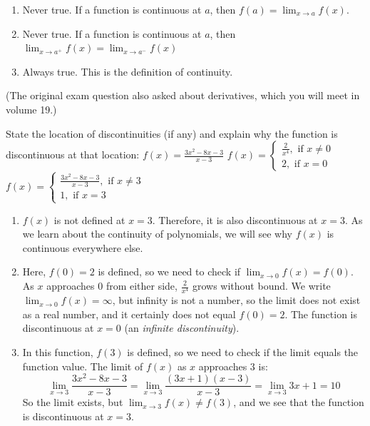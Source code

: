\begin{Answer}[ref = continuity1]
\begin{enumerate}
\item Never true. If a function is continuous at $a$, then $f(a) = \lim_{x \to 
a} f(x)$. 
\item Never true. If a function is continuous at $a$, then $\lim_{x \to a^+} 
f(x) = \lim_{x \to a^-} f(x)$
\item Always true. This is the definition of continuity.
\end{enumerate}
(The original exam question also asked about derivatives, which you will
meet in volume 19.)
\end{Answer}

\begin{Exercise}[title=Limits Practice 5, label=limits5]
State the location of discontinuities (if any) and explain why the function is 
discontinuous at that location:
    \Question $f(x) = \frac{3x^2-8x-3}{x-3}$
    \Question $f(x) = \begin{cases}
    \frac{2}{x^4}, \text{ if } x \neq 0\\
    2, \text{ if } x=0
    \end{cases}$
    \Question $f(x) = \begin{cases}
        \frac{3x^2-8x-3}{x-3}, \text{ if } x \neq 3\\
        1, \text{ if } x=3
    \end{cases}$
\end{Exercise}

\begin{Answer}[ref=limits5]
    \begin{enumerate}
    \item $f(x)$ is not defined at $x = 3$. Therefore, it is also discontinuous
     at $x = 3$. As we learn about the continuity of polynomials, we will see 
     why $f(x)$ is continuous everywhere else. 
    \item Here, $f(0) = 2$ is defined, so we need to check if
    $\lim_{x \to 0}f(x) = f(0)$. As $x$ approaches 0 from either side,
    $\frac{2}{x^4}$ grows without bound. We write
    $\lim_{x \to 0}f(x) = \infty$, but infinity is not a number, so the
    limit does not exist as a real number, and it certainly does not equal
    $f(0) = 2$. The function is discontinuous at $x=0$ (an
    \emph{infinite discontinuity}).
    \item In this function, $f(3)$ is defined, so we need to check if the limit 
    equals the function value. The limit of $f(x)$ as $x$ approaches $3$ is: 
    $$\lim_{x \to 3}\frac{3x^2-8x-3}{x-3} = \lim_{x \to 3}
    \frac{(3x+1)(x-3)}{x-3} = \lim_{x \to 3}3x+1 = 10$$
    So the limit exists, but $\lim_{x \to 3}f(x) \neq f(3)$, and we see that the 
    function is discontinuous at $x=3$.
	\end{enumerate}
\end{Answer}

